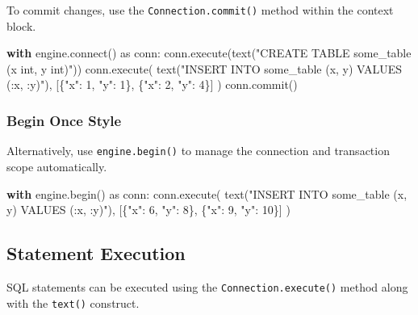 \documentclass[
  letterpaper,
  DIV=11,
  numbers=noendperiod]{scrreprt}
\newenvironment{Shaded}{\begin{snugshade}}{\end{snugshade}}
\newcommand{\ControlFlowTok}[1]{\textcolor[rgb]{0.00,0.23,0.31}{\textbf{#1}}}
\newcommand{\DecValTok}[1]{\textcolor[rgb]{0.68,0.00,0.00}{#1}}
\newcommand{\ExtensionTok}[1]{\textcolor[rgb]{0.00,0.23,0.31}{#1}}
\newcommand{\ImportTok}[1]{\textcolor[rgb]{0.00,0.46,0.62}{#1}}
\newcommand{\NormalTok}[1]{\textcolor[rgb]{0.00,0.23,0.31}{#1}}
\newcommand{\StringTok}[1]{\textcolor[rgb]{0.13,0.47,0.30}{#1}}
\begin{document}
To commit changes, use the \texttt{Connection.commit()} method within
the context block.

\begin{Shaded}
\begin{Highlighting}[]
\ControlFlowTok{with}\NormalTok{ engine.}\ExtensionTok{connect}\NormalTok{() }\ImportTok{as}\NormalTok{ conn:}
\NormalTok{    conn.execute(text(}\StringTok{"CREATE TABLE some\_table (x int, y int)"}\NormalTok{))}
\NormalTok{    conn.execute(}
\NormalTok{        text(}\StringTok{"INSERT INTO some\_table (x, y) VALUES (:x, :y)"}\NormalTok{),}
\NormalTok{        [\{}\StringTok{"x"}\NormalTok{: }\DecValTok{1}\NormalTok{, }\StringTok{"y"}\NormalTok{: }\DecValTok{1}\NormalTok{\}, \{}\StringTok{"x"}\NormalTok{: }\DecValTok{2}\NormalTok{, }\StringTok{"y"}\NormalTok{: }\DecValTok{4}\NormalTok{\}]}
\NormalTok{    )}
\NormalTok{    conn.commit()}
\end{Highlighting}
\end{Shaded}

\subsubsection{Begin Once Style}\label{begin-once-style}

Alternatively, use \texttt{engine.begin()} to manage the connection and
transaction scope automatically.

\begin{Shaded}
\begin{Highlighting}[]
\ControlFlowTok{with}\NormalTok{ engine.begin() }\ImportTok{as}\NormalTok{ conn:}
\NormalTok{    conn.execute(}
\NormalTok{        text(}\StringTok{"INSERT INTO some\_table (x, y) VALUES (:x, :y)"}\NormalTok{),}
\NormalTok{        [\{}\StringTok{"x"}\NormalTok{: }\DecValTok{6}\NormalTok{, }\StringTok{"y"}\NormalTok{: }\DecValTok{8}\NormalTok{\}, \{}\StringTok{"x"}\NormalTok{: }\DecValTok{9}\NormalTok{, }\StringTok{"y"}\NormalTok{: }\DecValTok{10}\NormalTok{\}]}
\NormalTok{    )}
\end{Highlighting}
\end{Shaded}

\subsection{Statement Execution}\label{statement-execution}

SQL statements can be executed using the \texttt{Connection.execute()}
method along with the \texttt{text()} construct.
\end{document}
